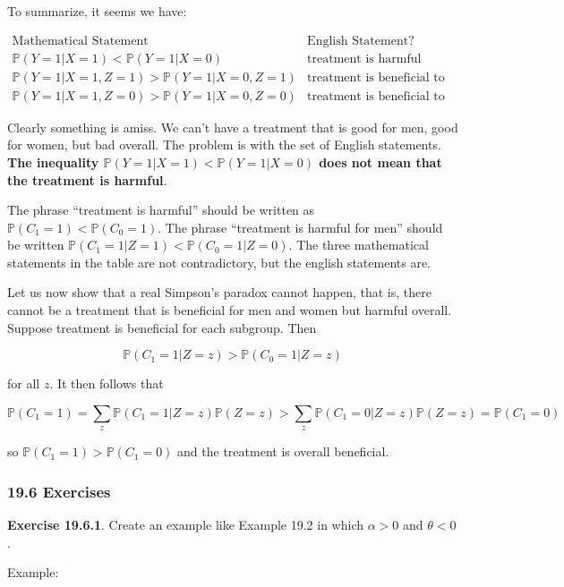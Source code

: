 To summarize, it seems we have:

\[
\begin{array}{ll}
\text{Mathematical Statement} & \text{English Statement?} \\
\hline
\mathbb{P}(Y = 1 | X = 1) < \mathbb{P}(Y = 1 | X = 0) & \text{treatment is harmful} \\
\mathbb{P}(Y = 1 | X = 1, Z = 1) > \mathbb{P}(Y = 1 | X = 0, Z = 1) & \text{treatment is beneficial to men} \\
\mathbb{P}(Y = 1 | X = 1, Z = 0) > \mathbb{P}(Y = 1 | X = 0, Z = 0) & \text{treatment is beneficial to women}
\end{array}
\]

Clearly something is amiss. We can't have a treatment that is good for
men, good for women, but bad overall. The problem is with the set of
English statements. \textbf{The inequality
\(\mathbb{P}(Y = 1 | X = 1) < \mathbb{P}(Y = 1 | X = 0)\) does not mean
that the treatment is harmful}.

The phrase ``treatment is harmful'' should be written as
\(\mathbb{P}(C_1 = 1) < \mathbb{P}(C_0 = 1)\). The phrase ``treatment is
harmful for men'' should be written
\(\mathbb{P}(C_1 = 1 | Z = 1) < \mathbb{P}(C_0 = 1 | Z = 0)\). The three
mathematical statements in the table are not contradictory, but the
english statements are.

Let us now show that a real Simpson's paradox cannot happen, that is,
there cannot be a treatment that is beneficial for men and women but
harmful overall. Suppose treatment is beneficial for each subgroup. Then

\[ \mathbb{P}(C_1 = 1 | Z = z) > \mathbb{P}(C_0 = 1 | Z = z) \]

for all \(z\). It then follows that

\[\mathbb{P}(C_1 = 1) = \sum_z \mathbb{P}(C_1 = 1 | Z = z) \mathbb{P}(Z = z) > \sum_z \mathbb{P}(C_1 = 0 | Z = z) \mathbb{P}(Z = z) = \mathbb{P}(C_1 = 0) \]

so \(\mathbb{P}(C_1 = 1) > \mathbb{P}(C_1 = 0)\) and the treatment is
overall beneficial.

\subsubsection{19.6 Exercises}\label{exercises}

\textbf{Exercise 19.6.1}. Create an example like Example 19.2 in which
\(\alpha > 0\) and \(\theta < 0\).

Example:

